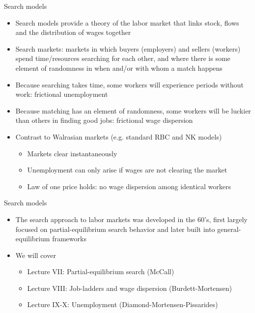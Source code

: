 \documentclass[9pt]{beamer}
\newcommand{\bit}{\begin{itemize}}
\newcommand{\eit}{\end{itemize}}
\begin{document}
\begin{frame}{Search models}

\bit
\setlength\itemsep{1.5em}

\item Search models provide a theory of the labor market that links stock, flows and the distribution of wages together

\item Search markets: markets in which buyers (employers) and sellers (workers) spend time/resources searching for each other, and where there is some element of randomness in when and/or with whom a match happens

\item Because searching takes time, some workers will experience periods without work: {\color{blue}frictional unemployment}

\item Because matching has an element of randomness, some workers will be luckier than others in finding good jobs: {\color{blue}frictional wage dispersion}


\item Contrast to Walrasian markets (e.g. standard RBC and NK models)
\bit
\setlength\itemsep{0.5em}
	\item Markets clear instantaneously
	\item Unemployment can only arise if wages are not clearing the market
	\item Law of one price holds: no wage dispersion among identical workers 
\eit
 
\eit

\end{frame}


\begin{frame}{Search models}

\bit
\setlength\itemsep{1.5em}

\item The search approach to labor markets was developed in the 60's, first largely focused on partial-equilibrium search behavior and later built into general-equilibrium frameworks

\item We will cover
\bit
\setlength\itemsep{0.5em}
\item Lecture VII: Partial-equilibrium search (McCall)
\item Lecture VIII: Job-ladders and wage dispersion (Burdett-Mortensen)
\item Lecture IX-X: Unemployment (Diamond-Mortensen-Pissarides)
\eit 
\eit

\end{frame}
\end{document}

